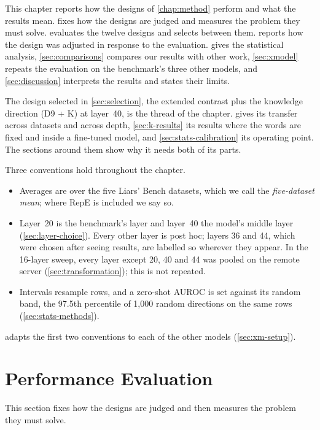\label{chap:results}

This chapter reports how the designs of \cref{chap:method} perform and what the results mean.
 fixes how the designs are judged and measures the problem they must solve.
 evaluates the twelve designs and selects between them. 
reports how the design was adjusted in response to the evaluation.  gives the
statistical analysis, \cref{sec:comparisons} compares our results with other work,
\cref{sec:xmodel} repeats the evaluation on the benchmark's three other models, and
\cref{sec:discussion} interprets the results and states their limits.

The design selected in \cref{sec:selection}, the extended contrast plus the knowledge direction
(D9 + K) at layer~40, is the thread of the chapter.  gives its transfer across
datasets and across depth, \cref{sec:k-results} its results where the words are fixed and inside a
fine-tuned model, and \cref{sec:stats-calibration} its operating point. The sections around them show
why it needs both of its parts.

Three conventions hold throughout the chapter.
\begin{itemize}[leftmargin=1.6em, itemsep=2pt]
\item Averages are over the five Liars' Bench datasets, which we call the \emph{five-dataset mean};
  where RepE is included we say so.
\item Layer~20 is the benchmark's layer and layer~40 the model's middle layer
  (\cref{sec:layer-choice}). Every other layer is post hoc; layers 36 and 44, which were chosen after
  seeing results, are labelled so wherever they appear. In the 16-layer sweep, every layer except 20, 40 and 44 was pooled on the
  remote server (\cref{sec:transformation}); this is not repeated.
\item Intervals resample rows, and a zero-shot AUROC is set against its random band, the 97.5th
  percentile of 1,000 random directions on the same rows (\cref{sec:stats-methods}).
\end{itemize}
 adapts the first two conventions to each of the other models (\cref{sec:xm-setup}).

\section{Performance Evaluation}
\label{sec:perf}

This section fixes how the designs are judged and then measures the problem they must solve.

